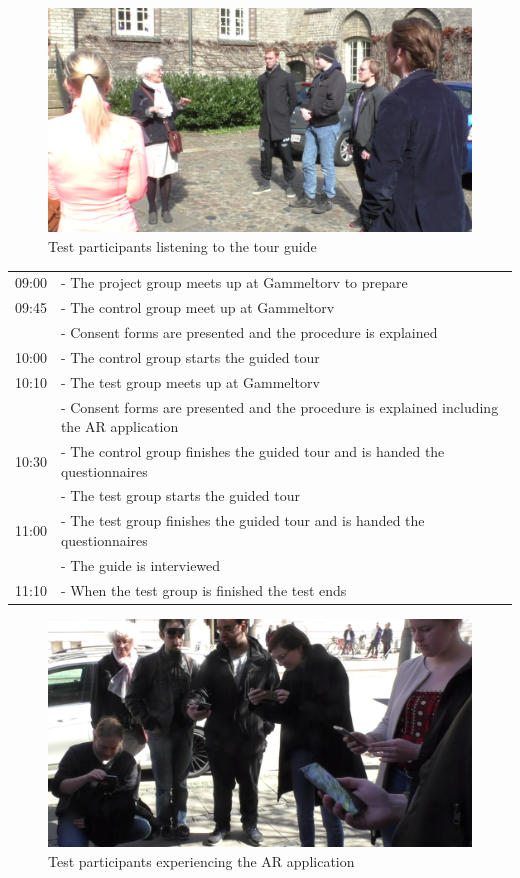 \begin{figure}[h!]
   \centering
   \includegraphics[width=\textwidth]{figures/participants_listen.png}
   \caption{Test participants listening to the tour guide}\label{fig:participants_listen}
\end{figure}

\begin{tabular}{l p{12cm}}
09:00 & - The project group meets up at Gammeltorv to prepare \\
09:45 & - The control group meet up at Gammeltorv \\
 & - Consent forms are presented and the procedure is explained \\
10:00 &   - The control group starts the guided tour \\
10:10 & - The test group meets up at Gammeltorv \\
 & - Consent forms are presented and the procedure is explained including the AR application \\
10:30 & - The control group finishes the guided tour and is handed the questionnaires \\
 & - The test group starts the guided tour
\\ 
11:00 & - The test group finishes the guided tour and is handed the questionnaires \\
 & - The guide is interviewed \\
11:10 & - When the test group is finished the test ends \\
\end{tabular}\pagebreak

\begin{figure}[h!]
   \centering
   \includegraphics[width=\textwidth]{figures/participants_app.png}
   \caption{Test participants experiencing the AR application}\label{fig:participants_app}
\end{figure}

